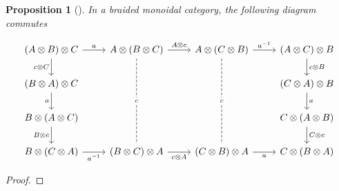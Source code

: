 \documentclass[reqno]{amsart}
\newtheorem{proposition}[theorem]{Proposition}
\theoremstyle{definition}
\theoremstyle{remark}
\begin{document}
   \begin{proposition}[]\label{braiding-gives-yang-baxter}
       In a braided monoidal category, the following
       diagram commutes

       \[\begin{tikzcd}
	{(A \otimes B) \otimes C} & {A \otimes(B \otimes C)} & {A \otimes (C \otimes B)} & {(A \otimes C) \otimes B} \\
	{(B \otimes A) \otimes C} &&& {(C \otimes A) \otimes B} \\
	{B \otimes (A \otimes C)} &&& {C \otimes (A \otimes B)} \\
	{B \otimes (C \otimes A)} & {(B \otimes C) \otimes A} & {(C \otimes B) \otimes A} & {C \otimes (B \otimes A)}
	\arrow["a", from=1-1, to=1-2]
	\arrow["{c \otimes C}"', from=1-1, to=2-1]
	\arrow["{A \otimes c}", from=1-2, to=1-3]
	\arrow["c"{description}, dashed, no head, from=1-2, to=4-2]
	\arrow["{a^{-1}}", from=1-3, to=1-4]
	\arrow["c"{description}, dashed, no head, from=1-3, to=4-3]
	\arrow["{c \otimes B}", from=1-4, to=2-4]
	\arrow["a"', from=2-1, to=3-1]
	\arrow["a", from=2-4, to=3-4]
	\arrow["{B \otimes c}"', from=3-1, to=4-1]
	\arrow["{C \otimes c}", from=3-4, to=4-4]
	\arrow["{a^{-1}}"', from=4-1, to=4-2]
	\arrow["{c \otimes A}"', from=4-2, to=4-3]
	\arrow["a"', from=4-3, to=4-4]
\end{tikzcd}\]
   \end{proposition}

   \begin{proof}
   \end{proof}
\end{document}
